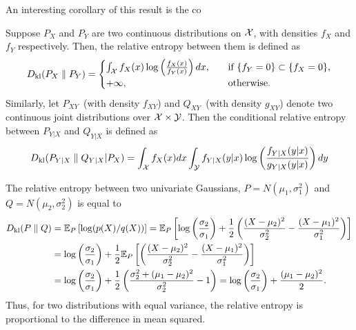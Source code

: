        An interesting corollary of this result is the co

        \begin{definition}
            \label{def:rel-ent-cont-1} Suppose $P_X$ and $P_Y$ are two continuous distributions on $\mathcal{X}$, with densities $f_X$ and $f_Y$ respectively. Then, the relative entropy between them is defined as 
            \begin{align}
                D_{\text{kl}}(P_X \parallel P_Y) =
                \begin{cases}
                \int_{\mathcal{X}} f_X(x) \log \left( \frac{f_X(x)}{f_Y(x)} \right) dx,  &\quad \text{if } \{f_Y=0\} \subset \{f_X=0\}, \\    
                 +\infty, &\quad \text{otherwise}. 
                \end{cases}
            \end{align}
            Similarly, let $P_{XY}$~(with density $f_{XY}$) and $Q_{XY}$~(with density $g_{XY}$) denote two continuous joint distributions over $\mathcal{X} \times \mathcal{Y}$. Then the conditional relative entropy between $P_{Y|X}$ and $Q_{Y|X}$ is defined as 
            \begin{align}
                D_{\text{kl}}(P_{Y|X} \parallel Q_{Y|X} | P_X) = \int_{\mathcal{X}}f_X(x) dx \int_{\mathcal{Y}} f_{Y|X}(y|x) \log \left( \frac{f_{Y|X}(y|x)}{g_{Y|X}(y|x)} \right) dy
            \end{align}
        \end{definition}

        \begin{example}
            \label{example:rel-ent-cont-1} 
            The relative entropy between two univariate Gaussians, $P = N(\mu_1, \sigma_1^2)$ and $Q=N(\mu_2, \sigma_2^2)$ is equal to 
            \begin{align}
                D_{\text{kl}}(P \parallel Q) &= \mathbb{E}_P \left[ \log (p(X)/q(X)) \right] = \mathbb{E}_P\left[ \log\left( \frac{\sigma_2}{\sigma_1}\right) + \frac{1}{2}\left( \frac{(X-\mu_2)^2}{\sigma_2^2} - \frac{(X-\mu_1)^2}{\sigma_1^2} \right) \right] \\
                &= \log\left( \frac{\sigma_2}{\sigma_1}\right) + \frac{1}{2} \mathbb{E}_P\left[ \left( \frac{(X-\mu_2)^2}{\sigma_2^2} - \frac{(X-\mu_1)^2}{\sigma_1^2} \right) \right] \\
                &= \log\left( \frac{\sigma_2}{\sigma_1}\right) + \frac{1}{2} \left( \frac{\sigma_2^2 + (\mu_1-\mu_2)^2}{\sigma_2^2}  - 1\right) 
                = \log\left( \frac{\sigma_2}{\sigma_1}\right) + \frac{(\mu_1-\mu_2)^2}{2}. 
            \end{align}
            Thus, for two distributions with equal variance,  the relative entropy is proportional to the difference in mean squared. 
        \end{example}

